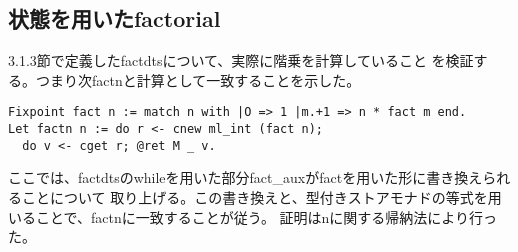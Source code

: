 \documentclass[japanese]{jssst_ppl}
\theoremstyle{definition}
\begin{document}
\iffalse
  \begin{verbatim}
    mc91 n m
   |《 definition of mc91 》|

   | \scalebox{0.8}{$\approx$} | while (fun nm : nat * nat =>
    let (n0, m0) := nm in if n0 == 0 then Ret (inl m0)
                                     else if 100 < m0
                                          then Ret (inr (n0.-1, m0 - 10))
                                          else Ret (inr (n0.+1, m0 + 11))) (n.+1, m)
   |《 fixpointE 》|
   | \scalebox{0.8}{$\approx$} | (if 100 < m then Ret (inr (n, m - 10))
                else Ret (inr (n.+2, m + 11))) >>= sum_rect (fun=> M nat) Ret (while mc91_body)
   |《 $m < 101$ 》|
    |\scalebox{0.8}{$\approx$}| Ret (inr (n.+2, m + 11)) >>= sum_rect (fun=> M nat) Ret (while mc91_body)
   |《 Monad law: Ret a >>= f = f a 》|
    |\scalebox{0.8}{$\approx$}| while mc91_body (n.+2, m + 1)
   |《 definition of mc91,fixpointE 》|
    |\scalebox{0.8}{$\approx$}| (if 100 < m + 11
        then Ret (inr (n.+1, m + 11 - 10))
        else Ret (inr (n.+3, m + 11 + 11))) >>= sum_rect (fun=> M nat) Ret (while mc91_body)
   |《 $90 \leq m \implies 100 < m + 11$, Monad law  》|
    |\scalebox{0.8}{$\approx$}|  while mc91_body (n.+1, m + 11 - 10) = mc91 n (m+1)

      \end{verbatim}

\fi

\subsection{状態を用いたfactorial}
3.1.3節で定義したfactdtsについて、実際に階乗を計算していること
を検証する。つまり次factnと計算として一致することを示した。

\begin{verbatim}
Fixpoint fact n := match n with |O => 1 |m.+1 => n * fact m end.
Let factn n := do r <- cnew ml_int (fact n);
  do v <- cget r; @ret M _ v.
\end{verbatim}

ここでは、factdtsのwhileを用いた部分fact\_auxがfactを用いた形に書き換えられることについて
取り上げる。この書き換えと、型付きストアモナドの等式を用いることで、factnに一致することが従う。
証明はnに関する帰納法により行った。
\end{document}
